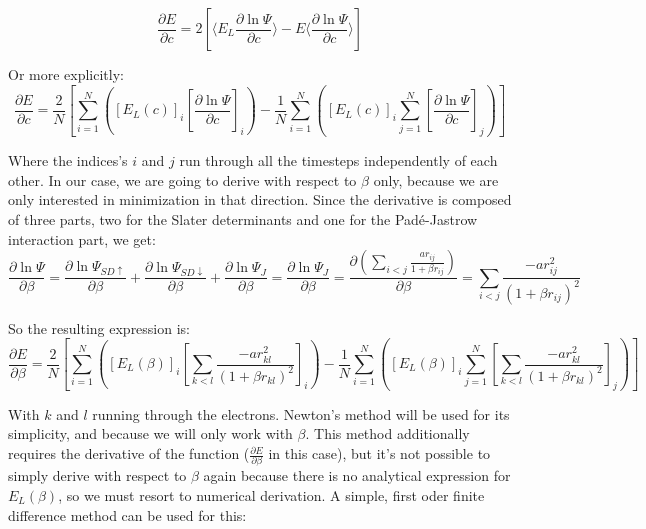 		\begin{equation}\frac{\partial E}{\partial c}=2\left[\langle E_L\frac{\partial\ln{\Psi}}{\partial c}\rangle-E\langle\frac{\partial\ln{\Psi}}{\partial c}\rangle\right]\end{equation}

		Or more explicitly:\\

		\begin{equation}\frac{\partial E}{\partial c}=\frac{2}{N}\left[\sum_{i=1}^N\left(\left[E_L\left(c\right)\right]_i\left[\frac{\partial\ln{\Psi}}{\partial c}\right]_i\right)-\frac{1}{N}\sum_{i=1}^N\left(\left[E_L\left(c\right)\right]_i\sum_{j=1}^N\left[\frac{\partial\ln{\Psi}}{\partial c}\right]_j\right)\right]\end{equation}

		Where the indices's $i$ and $j$ run through all the timesteps independently of each other. In our case, we are going to derive with respect to $\beta$ only, because we are only interested in minimization in that direction. Since the derivative is composed of three parts, two for the Slater determinants and one for the Padé-Jastrow interaction part, we get:\\

		\begin{equation}\frac{\partial\ln{\Psi}}{\partial\beta}=\frac{\partial\ln{\Psi_{SD\uparrow}}}{\partial\beta}+\frac{\partial\ln{\Psi_{SD\downarrow}}}{\partial\beta}+\frac{\partial\ln{\Psi_J}}{\partial\beta}=\frac{\partial\ln{\Psi_J}}{\partial\beta}=\frac{\partial\left(\sum_{i<j}\frac{ar_{ij}}{1+\beta r_{ij}}\right)}{\partial\beta}=\sum_{i<j}\frac{-ar_{ij}^2}{\left(1+\beta r_{ij}\right)^2}\end{equation}

		So the resulting expression is:\\

		\begin{equation}\frac{\partial E}{\partial\beta}=\frac{2}{N}\left[\sum_{i=1}^N\left(\left[E_L\left(\beta\right)\right]_i\left[\sum_{k<l}\frac{-ar_{kl}^2}{\left(1+\beta r_{kl}\right)^2}\right]_i\right)-\frac{1}{N}\sum_{i=1}^N\left(\left[E_L\left(\beta\right)\right]_i\sum_{j=1}^N\left[\sum_{k<l}\frac{-ar_{kl}^2}{\left(1+\beta r_{kl}\right)^2}\right]_j\right)\right]\end{equation}

		With $k$ and $l$ running through the electrons. Newton's method will be used for its simplicity, and because we will only work with $\beta$. This method additionally requires the derivative of the function ($\frac{\partial E}{\partial\beta}$ in this case), but it's not possible to simply derive with respect to $\beta$ again because there is no analytical expression for $E_L\left(\beta\right)$, so we must resort to numerical derivation. A simple, first oder finite difference method can be used for this:\\

